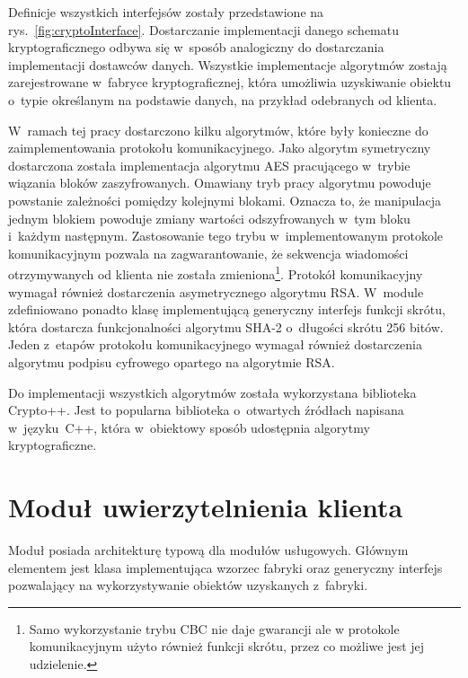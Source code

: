 
Definicje wszystkich interfejsów zostały przedstawione na
rys.~\ref{fig:cryptoInterface}. Dostarczanie implementacji danego
schematu kryptograficznego odbywa się w~sposób analogiczny do
dostarczania implementacji dostawców danych. Wszystkie implementacje
algorytmów zostają zarejestrowane w~fabryce kryptograficznej, która
umożliwia uzyskiwanie obiektu o~typie określanym na podstawie danych,
na przykład odebranych od klienta.

W~ramach tej pracy dostarczono kilku algorytmów, które były konieczne
do zaimplementowania protokołu komunikacyjnego. Jako algorytm
symetryczny dostarczona została implementacja algorytmu AES
pracującego w~trybie wiązania bloków zaszyfrowanych. Omawiany tryb
pracy algorytmu powoduje powstanie zależności pomiędzy kolejnymi
blokami. Oznacza to, że manipulacja jednym blokiem powoduje zmiany
wartości odszyfrowanych w~tym bloku i~każdym następnym. Zastosowanie
tego trybu w~implementowanym protokole komunikacyjnym pozwala na
zagwarantowanie, że sekwencja wiadomości otrzymywanych od klienta nie
została zmieniona\footnote{Samo wykorzystanie trybu CBC nie daje
  gwarancji ale w protokole komunikacyjnym użyto również
  funkcji skrótu, przez co możliwe jest jej udzielenie.}. Protokół
komunikacyjny wymagał również dostarczenia asymetrycznego algorytmu
RSA. W~module zdefiniowano ponadto klasę implementującą generyczny
interfejs funkcji skrótu, która dostarcza funkcjonalności algorytmu
SHA-2 o~długości skrótu 256 bitów. Jeden z~etapów protokołu
komunikacyjnego wymagał również dostarczenia algorytmu podpisu
cyfrowego opartego na algorytmie RSA.

Do implementacji wszystkich algorytmów została wykorzystana biblioteka
Crypto++. Jest to popularna biblioteka o~otwartych źródłach napisana
w~języku~C++, która w~obiektowy sposób udostępnia algorytmy
kryptograficzne.

\section[Moduł uwierzytelnienia][Moduł uwierzytelnienia klienta]{Moduł uwierzytelnienia klienta}

Moduł posiada architekturę typową dla modułów usługowych. Głównym
elementem jest klasa implementująca wzorzec fabryki oraz generyczny
interfejs pozwalający na wykorzystywanie obiektów uzyskanych
z~fabryki.

